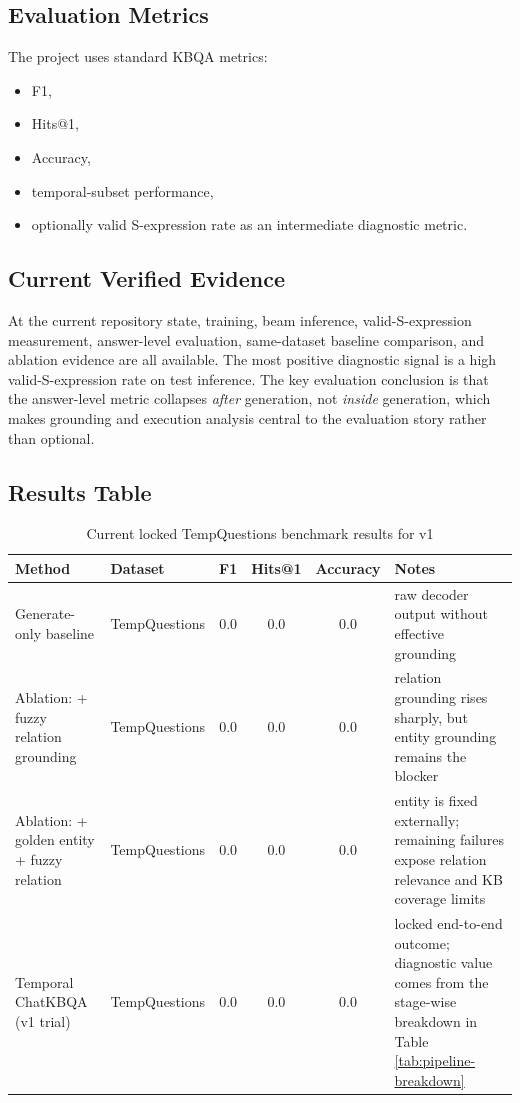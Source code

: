 \documentclass[a4paper,11pt]{article}
\begin{document}
\subsection{Evaluation Metrics}

The project uses standard KBQA metrics:

\begin{itemize}[leftmargin=1.2cm]
  \item F1,
  \item Hits@1,
  \item Accuracy,
  \item temporal-subset performance,
  \item optionally valid S-expression rate as an intermediate diagnostic metric.
\end{itemize}

\subsection{Current Verified Evidence}

At the current repository state, training, beam inference, valid-S-expression measurement, answer-level evaluation, same-dataset baseline comparison, and ablation evidence are all available. The most positive diagnostic signal is a high valid-S-expression rate on test inference. The key evaluation conclusion is that the answer-level metric collapses \emph{after} generation, not \emph{inside} generation, which makes grounding and execution analysis central to the evaluation story rather than optional.

\subsection{Results Table}

\begin{table}[H]
\centering
\caption{Current locked TempQuestions benchmark results for v1}
\label{tab:results}
\begin{tabular}{p{4.1cm}p{2.1cm}c c c p{3.1cm}}
\toprule
\textbf{Method} & \textbf{Dataset} & \textbf{F1} & \textbf{Hits@1} & \textbf{Accuracy} & \textbf{Notes} \\
\midrule
Generate-only baseline & TempQuestions & 0.0 & 0.0 & 0.0 & raw decoder output without effective grounding \\
Ablation: + fuzzy relation grounding & TempQuestions & 0.0 & 0.0 & 0.0 & relation grounding rises sharply, but entity grounding remains the blocker \\
Ablation: + golden entity + fuzzy relation & TempQuestions & 0.0 & 0.0 & 0.0 & entity is fixed externally; remaining failures expose relation relevance and KB coverage limits \\
Temporal ChatKBQA (v1 trial) & TempQuestions & 0.0 & 0.0 & 0.0 & locked end-to-end outcome; diagnostic value comes from the stage-wise breakdown in Table \ref{tab:pipeline-breakdown} \\
\bottomrule
\end{tabular}
\end{table}
\end{document}
